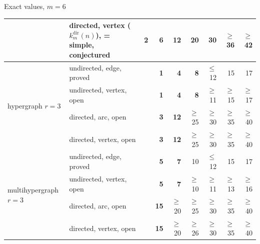 \documentclass[aspectratio=1610,11pt]{beamer}
\begin{document}
\begin{frame}{Exact values, $m=6$}
{\begin{tabular}{llrrrrrrr}
 & directed, vertex ($k_m^{\mathrm{dir}}(n)$), \textcolor{vtConjectured}{= simple, conjectured} & \textcolor{vtExact}{\textbf{2}} & \textcolor{vtExact}{\textbf{6}} & \textcolor{vtExact}{\textbf{12}} & \textcolor{vtExact}{\textbf{20}} & \textcolor{vtExact}{\textbf{30}} & \textcolor{vtConjectured}{$\ge$36} & \textcolor{vtConjectured}{$\ge$42} \\
\midrule
\multirow{4}{*}{hypergraph $r=3$} & undirected, edge, \textcolor{vtProved}{proved} &  & \textcolor{vtExact}{\textbf{1}} & \textcolor{vtExact}{\textbf{4}} & \textcolor{vtExact}{\textbf{8}} & \textcolor{vtProved}{$\le$12} & \textcolor{vtProved}{15} & \textcolor{vtProved}{17} \\
 & undirected, vertex, \textcolor{vtOpen}{open} &  & \textcolor{vtExact}{\textbf{1}} & \textcolor{vtExact}{\textbf{4}} & \textcolor{vtExact}{\textbf{8}} & \textcolor{vtOpen}{$\ge$11} & \textcolor{vtOpen}{$\ge$15} & \textcolor{vtOpen}{$\ge$17} \\
 & directed, arc, \textcolor{vtOpen}{open} &  & \textcolor{vtExact}{\textbf{3}} & \textcolor{vtExact}{\textbf{12}} & \textcolor{vtOpen}{$\ge$25} & \textcolor{vtOpen}{$\ge$30} & \textcolor{vtOpen}{$\ge$35} & \textcolor{vtOpen}{$\ge$40} \\
 & directed, vertex, \textcolor{vtOpen}{open} &  & \textcolor{vtExact}{\textbf{3}} & \textcolor{vtExact}{\textbf{12}} & \textcolor{vtOpen}{$\ge$25} & \textcolor{vtOpen}{$\ge$30} & \textcolor{vtOpen}{$\ge$35} & \textcolor{vtOpen}{$\ge$40} \\
\midrule
\multirow{4}{*}{multihypergraph $r=3$} & undirected, edge, \textcolor{vtProved}{proved} &  & \textcolor{vtExact}{\textbf{5}} & \textcolor{vtExact}{\textbf{7}} & \textcolor{vtProved}{10} & \textcolor{vtProved}{$\le$12} & \textcolor{vtProved}{15} & \textcolor{vtProved}{17} \\
 & undirected, vertex, \textcolor{vtOpen}{open} &  & \textcolor{vtExact}{\textbf{5}} & \textcolor{vtExact}{\textbf{7}} & \textcolor{vtOpen}{$\ge$10} & \textcolor{vtOpen}{$\ge$11} & \textcolor{vtOpen}{$\ge$13} & \textcolor{vtOpen}{$\ge$16} \\
 & directed, arc, \textcolor{vtOpen}{open} &  & \textcolor{vtExact}{\textbf{15}} & \textcolor{vtOpen}{$\ge$20} & \textcolor{vtOpen}{$\ge$25} & \textcolor{vtOpen}{$\ge$30} & \textcolor{vtOpen}{$\ge$35} & \textcolor{vtOpen}{$\ge$40} \\
 & directed, vertex, \textcolor{vtOpen}{open} &  & \textcolor{vtExact}{\textbf{15}} & \textcolor{vtOpen}{$\ge$20} & \textcolor{vtOpen}{$\ge$26} & \textcolor{vtOpen}{$\ge$30} & \textcolor{vtOpen}{$\ge$35} & \textcolor{vtOpen}{$\ge$40} \\
\bottomrule
\end{tabular}}
\end{frame}
\end{document}
